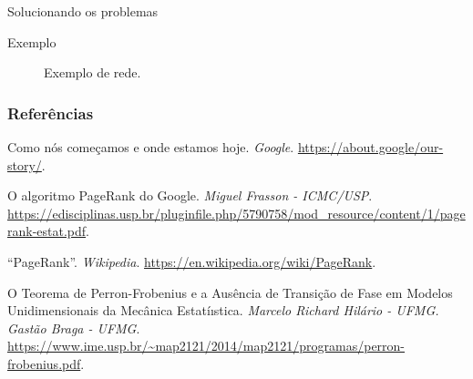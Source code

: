 \documentclass{beamer}
\begin{document}
\begin{frame}{Solucionando os problemas}
\begin{itemize}

\end{itemize}
\end{frame}
\begin{frame}{Exemplo}
    \begin{figure}[H]
    \centering
    \caption{Exemplo de rede.}
    \label{exemplo}
\end{figure}
\end{frame}
\begin{frame}[allowframebreaks]
        \frametitle{Referências}
\begin{thebibliography}{9}

 Como nós começamos e onde estamos hoje. \textit{Google}. \url{https://about.google/our-story/}.

 O algoritmo PageRank do Google. \textit{Miguel Frasson - ICMC/USP}. \url{https://edisciplinas.usp.br/pluginfile.php/5790758/mod_resource/content/1/pagerank-estat.pdf}.

 ``PageRank''. \textit{Wikipedia}. \url{https://en.wikipedia.org/wiki/PageRank}.

 O Teorema de Perron-Frobenius e a Ausência de Transição de Fase em Modelos Unidimensionais da Mecânica Estatíıstica. \textit{Marcelo Richard Hilário - UFMG. Gastão Braga - UFMG}. \url{https://www.ime.usp.br/~map2121/2014/map2121/programas/perron-frobenius.pdf}.

\end{thebibliography}

\end{frame}
\end{document}
